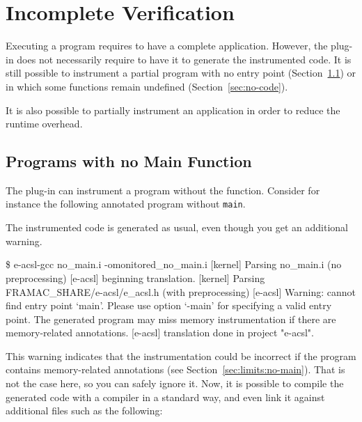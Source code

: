 \section{Incomplete Verification} %
\label{sec:incomplete}

Executing a \C program requires to have a complete application. However, the
\eacsl plug-in does not necessarily require to have it to generate the
instrumented code. It is still possible to instrument a partial program with no
entry point (Section~\ref{sec:no-main}) or in which some functions remain
undefined (Section~\ref{sec:no-code}).

It is also possible to partially instrument an application in order to reduce
the runtime overhead.


\subsection{Programs with no Main Function}
\label{sec:no-main}

The \eacsl plug-in can instrument a program without the  function.
Consider for instance the following annotated program without \texttt{main}.


The instrumented code is generated as usual, even though you get an additional
warning.
\begin{logs}
\$ e-acsl-gcc no_main.i -omonitored_no_main.i
[kernel] Parsing no_main.i (no preprocessing)
[e-acsl] beginning translation.
[kernel] Parsing FRAMAC_SHARE/e-acsl/e_acsl.h (with preprocessing)
[e-acsl] Warning: cannot find entry point `main'.
  Please use option `-main' for specifying a valid entry point.
  The generated program may miss memory instrumentation
  if there are memory-related annotations.
[e-acsl] translation done in project "e-acsl".
\end{logs}

This warning indicates that the instrumentation could be incorrect if the
program contains memory-related annotations (see
Section~\ref{sec:limits:no-main}). That is not the case here, so you can
safely ignore it. Now, it is possible to compile the generated code with a \C
compiler in a standard way, and even link it against additional files such as
the following:

